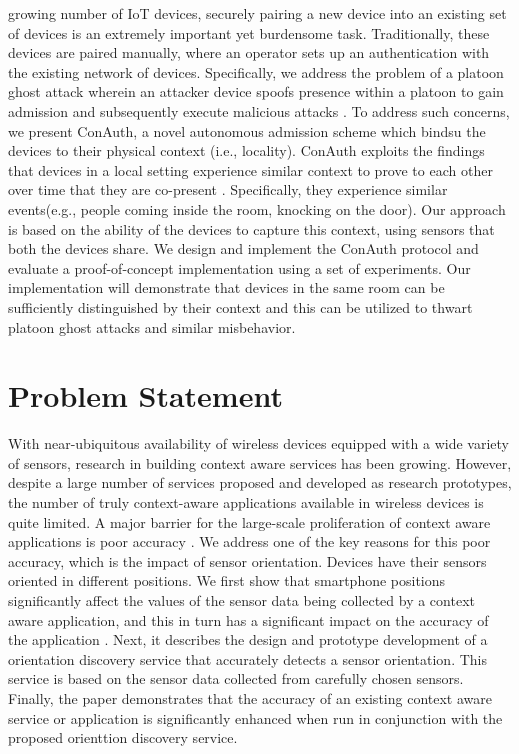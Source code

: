 \documentclass[journal]{IEEEtranTIE}
\begin{document}
growing number of IoT devices, securely pairing a new device into an existing
set of devices is an extremely important yet burdensome task. Traditionally,
these devices are paired manually, where an operator sets up an authentication
with the existing network of devices. Specifically, we address the problem of a
platoon ghost attack wherein an attacker device spoofs presence within a platoon
to gain admission and subsequently execute malicious attacks \cite{Han}. To
address such concerns, we present ConAuth, a novel autonomous admission scheme
which bindsu the devices to their physical context (i.e., locality). ConAuth
exploits the findings that devices in a local setting experience similar context
to prove to each other over time that they are co-present \cite{Han}.
Specifically, they experience similar events(e.g., people coming inside the
room, knocking on the door). Our approach is based on the ability of the devices
to capture this context, using sensors that both the devices share. We design
and implement the ConAuth protocol and evaluate a proof-of-concept
implementation using a set of experiments. Our implementation will demonstrate
that devices in the same room can be sufficiently distinguished by their context
and this can be utilized to thwart platoon ghost attacks and similar misbehavior.

\section{Problem Statement}

With near-ubiquitous availability of wireless devices equipped with a wide
variety of sensors, research in building context aware services has been
growing. However, despite a large number of services proposed and developed as
research prototypes, the number of truly context-aware applications available in
wireless devices is quite limited. A major barrier for the large-scale
proliferation of context aware applications is poor accuracy \cite{Alanezi}. We
address one of the key reasons for this poor accuracy, which is the impact of
sensor orientation. Devices have their sensors oriented in different positions.
We first show that smartphone positions significantly affect the values of the
sensor data being collected by a context aware application, and this in turn
has a significant impact on the accuracy of the application \cite{Alanezi}.
Next, it describes the design and prototype development of a orientation
discovery service that accurately detects a sensor orientation. This service is
based on the sensor data collected from carefully chosen sensors. Finally, the
paper demonstrates that the accuracy of an existing context aware service or
application is significantly enhanced when run in conjunction with the proposed
orienttion discovery service.
\end{document}
